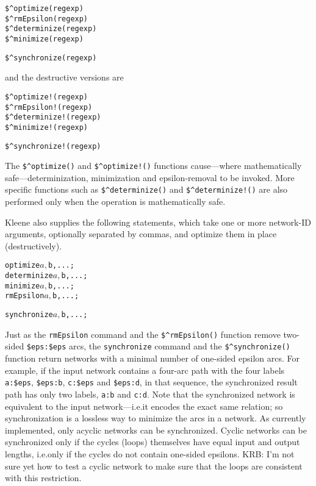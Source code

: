 \begin{Verbatim}[fontsize=\small]
$^optimize(regexp)
$^rmEpsilon(regexp)
$^determinize(regexp)
$^minimize(regexp)
\end{Verbatim}

\begin{Verbatim}[fontsize=\small]
$^synchronize(regexp)
\end{Verbatim}

\noindent
and the destructive versions are

\begin{Verbatim}[fontsize=\small]
$^optimize!(regexp)
$^rmEpsilon!(regexp)
$^determinize!(regexp)
$^minimize!(regexp)
\end{Verbatim}

\begin{Verbatim}[fontsize=\small]
$^synchronize!(regexp)
\end{Verbatim}

\noindent
The \verb!$^optimize()! and \verb/$^optimize!()/ functions cause---where
mathematically safe---determinization, minimization and epsilon-removal to
be invoked.  More specific functions such as \verb!$^determinize()! and
\verb/$^determinize!()/ are also performed only when the operation is
mathematically safe.

Kleene also supplies the following statements, which take one or more
network-ID arguments, optionally separated by commas, and optimize them
in place (destructively).

\begin{alltt}
optimize $a, $b, ... ;
determinize $a, $b, ... ;
minimize $a, $b, ... ;
rmEpsilon $a, $b, ... ;
\end{alltt}

\begin{alltt}
synchronize $a, $b, ... ;
\end{alltt}

Just as the \texttt{rmEpsilon} command and the \verb!$^rmEpsilon()!
function remove two-sided \verb!$eps:$eps! arcs, the \texttt{synchronize}
command and the \verb!$^synchronize()! function return networks with a
minimal number of one-sided epsilon arcs.  For example, if the input
network contains a four-arc path with the four labels \verb!a:$eps!,
\verb!$eps:b!, \verb!c:$eps! and \verb!$eps:d!, in that sequence, the
synchronized result path has only two labels, \verb!a:b! and \verb!c:d!.
Note that the synchronized network is equivalent to the input
network---i.e.\@ it encodes the exact same relation; so synchronization
is a lossless way to minimize the arcs in a network.  As currently
implemented, only acyclic networks can be synchronized. Cyclic
networks can be synchronized only if the cycles (loops) themselves have
equal input and output lengths, i.e.\@ only if the cycles do not contain
one-sided epsilons.  KRB:  I'm not sure yet how to test a cyclic network to
make sure that the loops are consistent with this restriction.


